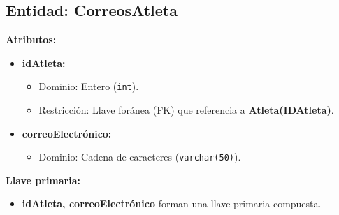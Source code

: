 \subsection*{Entidad: CorreosAtleta}
\textbf{Atributos:}
\begin{itemize}
    \item \textbf{idAtleta:}
    \begin{itemize}
        \item Dominio: Entero (\texttt{int}).
        \item Restricción: Llave foránea (FK) que referencia a \textbf{Atleta(IDAtleta)}.
    \end{itemize}
    \item \textbf{correoElectrónico:}
    \begin{itemize}
        \item Dominio: Cadena de caracteres (\texttt{varchar(50)}).
    \end{itemize}
\end{itemize}
\textbf{Llave primaria:}
\begin{itemize}
    \item \textbf{idAtleta, correoElectrónico} forman una llave primaria compuesta.
\end{itemize}

